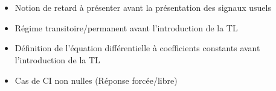 \section*{}     
\begin{itemize}
\item Notion de retard à présenter avant la présentation des signaux usuels
\item Régime transitoire/permanent avant l'introduction de la TL
\item Définition de l'équation différentielle à coefficients constants avant 
      l'introduction de la TL
\item Cas de CI non nulles (Réponse forcée/libre)
\end{itemize}
\section*{}

\section*{}


